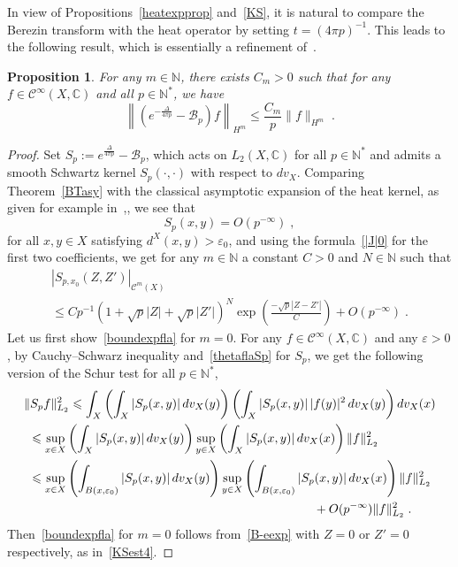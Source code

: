 \documentclass[11pt]{article}
\newtheorem{prop}[theo]{Proposition}
\theoremstyle{definition}
\numberwithin{equation}{section}
\numberwithin{figure}{section}
\numberwithin{table}{section}
\newcommand{\N}{{\mathbb{N}}}
\newcommand{\CCC}{{\mathbb{C}}}
\newcommand{\CC}{\mathcal{C}}
\newcommand{\cB}{{\mathcal{B}}}
\renewcommand\leq {\leqslant}
\newcommand\< {\mathcal{h}}
\renewcommand\> {\mathcal{i}}
\newcommand{\cinf}{\CC^\infty}
\renewcommand{\epsilon}{\varepsilon}
\newcommand*\cC{\mathscr{C}}
\begin{document}
In view of Propositions~\ref{heatexpprop} and~\ref{KS}, it is natural to compare the Berezin transform with the heat operator by setting $t=(4\pi p)^{-1}$. This leads to the following result, which is essentially a refinement of~\cite[Theorem~0.1]{LM07}.

\begin{prop}\label{boundexp}
For any $m\in\N$, there exists $C_m>0$ such that for any $f\in\cinf(X,\CCC)$ and all $p\in\N^*$, we have
\begin{equation}\label{boundexpfla}
\left\|\left(e^{-\frac{\Delta}{4\pi p}}-\cB_p\right)f\right\|_{H^m}\leq
\frac{C_m}{p}\|f\|_{H^m}\;.
\end{equation}
\end{prop}
\begin{proof}
Set $S_p:=e^{\frac{\Delta}{4\pi p}}-\cB_p$, which acts on $L_2(X,\CCC)$ for all $p\in\N^*$ and admits a smooth Schwartz kernel $S_p(\cdot,\cdot)$ with respect to $dv_X$. Comparing Theorem~\ref{BTasy} with the classical asymptotic expansion of the heat kernel, as given for example in~\cite[Theorem~2.29]{BGV04},\cite{Kannai}, we see that
\begin{equation}\label{thetaflaSp}
S_p(x,y)=O(p^{-\infty})\;,
\end{equation}
for all $x,y\in X$ satisfying $d^X(x,y)>\epsilon_0$, and using the formula~\eqref{|J|0} for the first two coefficients, we get for any $m\in\N$ a constant $C>0$ and $N\in\N$ such that
\begin{multline}\label{B-eexp}
\left|S_{p,x_0}(Z,Z')\right|_{\cC^m(X)}\\
\leq Cp^{-1} (1+\sqrt{p}|Z|+\sqrt{p}|Z'|)^N
\exp\left(\frac{-\sqrt{p}|Z-Z'|}{C}\right)
+O(p^{-\infty})\;.
\end{multline}
Let us first show~\eqref{boundexpfla} for $m=0$. For any $f\in\cinf(X,\CCC)$ and any $\epsilon>0$, by Cauchy--Schwarz inequality and~\eqref{thetaflaSp} for $S_p$, we get the following version of the Schur test for all $p\in\N^*$,
\begin{multline}\label{Schurtest}
\|S_p f\|_{L_2}^2\leq\int_X\left(\int_X |S_p(x,y)|\,dv_X(y)\right)
\left(\int_X |S_p(x,y)|\,|f(y)|^2\,dv_X(y)\right)dv_X(x)\\
\begin{aligned}
&\leq\sup_{x\in X}\left(\int_X|S_p(x,y)|\,dv_X(y)\right)
\sup_{y\in X}\left(\int_X|S_p(x,y)|\,dv_X(x)\right)\|f\|_{L_2}^2\\
&\leq\sup_{x\in X}\left(\int_{B(x,\epsilon_0)}|S_p(x,y)|\,dv_X(y)\right)
\sup_{y\in X}\left(\int_{B(x,\epsilon_0)}|S_p(x,y)|\,dv_X(x)\right)\|f\|_{L_2}^2\\
&\mkern415mu +O(p^{-\infty})\|f\|_{L_2}^2\;.
\end{aligned}
\end{multline}
Then~\eqref{boundexpfla} for $m=0$ follows from~\eqref{B-eexp} with $Z=0$ or $Z'=0$ respectively, as in~\eqref{KSest4}.


\end{proof}
\end{document}
